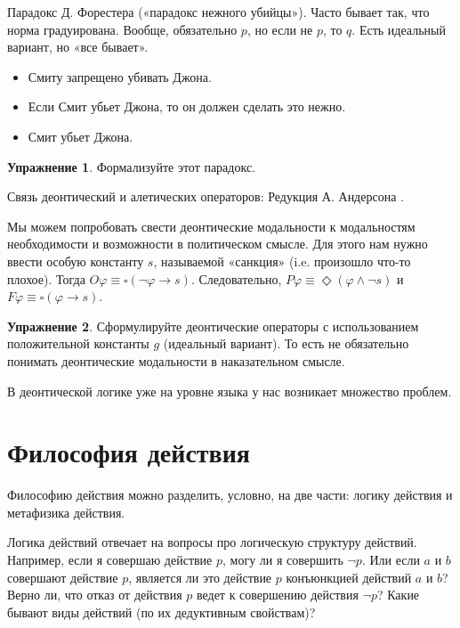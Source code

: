 \documentclass[openany]{book}
\theoremstyle{plain}
\theoremstyle{definition}
\newtheorem{xrc}{Упражнение}[]
\begin{document}
Парадокс Д. Форестера («парадокс нежного убийцы»). Часто бывает так, что норма градуирована. Вообще, обязательно \(p\), но если не \(p\), то \(q\). Есть идеальный вариант, но «все бывает».

\begin{itemize}
    \item{Смиту запрещено убивать Джона.}
    \item{Если Смит убьет Джона, то он должен сделать это нежно.}
    \item{Смит убьет Джона.}
\end{itemize}

\begin{xrc}
    Формализуйте этот парадокс.
\end{xrc}

Связь деонтический и алетических операторов: Редукция А. Андерсона \cite{Anderson}. 

Мы можем попробовать свести деонтические модальности к модальностям необходимости и возможности в политическом смысле. Для этого нам нужно ввести особую константу \(s\), называемой «санкция» (i.e. произошло что-то плохое). Тогда \(O \varphi \equiv \square (\neg \varphi \to s)\). Следовательно, \(P \varphi \equiv \Diamond (\varphi \land \neg s)\) и \(F \varphi \equiv \square (\varphi \to s)\).

\begin{xrc}
    Сформулируйте деонтические операторы с использованием положительной константы \(g\) (идеальный вариант). То есть не обязательно понимать деонтические модальности в наказательном смысле.
\end{xrc}

В деонтической логике уже на уровне языка у нас возникает множество проблем.

\section{Философия действия}

Философию действия можно разделить, условно, на две части: логику действия и метафизика действия.

Логика действий отвечает на вопросы про логическую структуру действий. Например, если я совершаю действие \(p\), могу ли я совершить \(\neg p\). Или если \(a\) и \(b\) совершают действие \(p\), является ли это действие \(p\) конъюнкцией действий \(a\) и \(b\)? Верно ли, что отказ от действия \(p\) ведет к совершению действия \(\neg p\)? Какие бывают виды действий (по их дедуктивным свойствам)?
\end{document}
